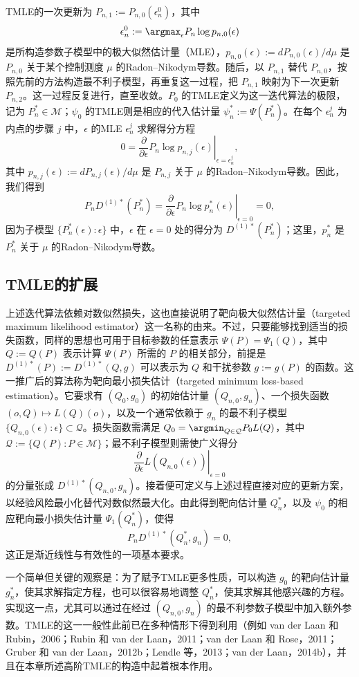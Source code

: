 TMLE的一次更新为 $P_{n,1}:=P_{n,0}(\epsilon_n^0)$，其中
\[
\epsilon_n^0:=\argmax_{\epsilon}P_n\log p_{n,0}(\epsilon)
\]
是所构造参数子模型中的极大似然估计量（MLE），$p_{n,0}(\epsilon):=dP_{n,0}(\epsilon)/d\mu$ 是 $P_{n,0}$ 关于某个控制测度 $\mu$ 的Radon--Nikodym导数。随后，以 $P_{n,1}$ 替代 $P_{n,0}$，按照先前的方法构造最不利子模型，再重复这一过程，把 $P_{n,1}$ 映射为下一次更新 $P_{n,2}$。这一过程反复进行，直至收敛。$P_0$ 的TMLE定义为这一迭代算法的极限，记为 $P_n^*\in\mathcal M$；$\psi_0$ 的TMLE则是相应的代入估计量 $\psi_n^*:=\Psi(P_n^*)$。在每个 $\epsilon_n^j$ 为内点的步骤 $j$ 中，$\epsilon$ 的MLE $\epsilon_n^j$ 求解得分方程
\[
0=\left.\frac{\partial}{\partial\epsilon}P_n\log p_{n,j}(\epsilon)\right|_{\epsilon=\epsilon_n^j},
\]
其中 $p_{n,j}(\epsilon):=dP_{n,j}(\epsilon)/d\mu$ 是 $P_{n,j}$ 关于 $\mu$ 的Radon--Nikodym导数。因此，我们得到
\[
P_nD^{(1)*}(P_n^*)=
\left.\frac{\partial}{\partial\epsilon}P_n\log p_n^*(\epsilon)\right|_{\epsilon=0}=0,
\]
因为子模型 $\{P_n^*(\epsilon):\epsilon\}$ 中，$\epsilon$ 在 $\epsilon=0$ 处的得分为 $D^{(1)*}(P_n^*)$；这里，$p_n^*$ 是 $P_n^*$ 关于 $\mu$ 的Radon--Nikodym导数。

\subsection{TMLE的扩展}

上述迭代算法依赖对数似然损失，这也直接说明了靶向极大似然估计量（targeted maximum likelihood estimator）这一名称的由来。不过，只要能够找到适当的损失函数，同样的思想也可用于目标参数的任意表示 $\Psi(P)=\Psi_1(Q)$，其中 $Q:=Q(P)$ 表示计算 $\Psi(P)$ 所需的 $P$ 的相关部分，前提是 $D^{(1)*}(P):=D^{(1)*}(Q,g)$ 可以表示为 $Q$ 和干扰参数 $g:=g(P)$ 的函数。这一推广后的算法称为靶向最小损失估计（targeted minimum loss-based estimation）。它要求有 $(Q_0,g_0)$ 的初始估计量 $(Q_{n,0},g_n)$、一个损失函数 $(o,Q)\mapsto L(Q)(o)$，以及一个通常依赖于 $g_n$ 的最不利子模型 $\{Q_{n,0}(\epsilon):\epsilon\}\subset\mathcal Q$。损失函数需满足 $Q_0=\argmin_{Q\in\mathcal Q}P_0L(Q)$，其中 $\mathcal Q:=\{Q(P):P\in\mathcal M\}$；最不利子模型则需使广义得分
\[
\left.\frac{\partial}{\partial\epsilon}L(Q_{n,0}(\epsilon))\right|_{\epsilon=0}
\]
的分量张成 $D^{(1)*}(Q_{n,0},g_n)$。接着便可定义与上述过程直接对应的更新方案，以经验风险最小化替代对数似然最大化。由此得到靶向估计量 $Q_n^*$，以及 $\psi_0$ 的相应靶向最小损失估计量 $\Psi_1(Q_n^*)$，使得
\[
P_nD^{(1)*}(Q_n^*,g_n)=0,
\]
这正是渐近线性与有效性的一项基本要求。

一个简单但关键的观察是：为了赋予TMLE更多性质，可以构造 $g_0$ 的靶向估计量 $g_n^*$，使其求解指定方程，也可以很容易地调整 $Q_n^*$，使其求解其他感兴趣的方程。实现这一点，尤其可以通过在经过 $(Q_{n,0},g_n)$ 的最不利参数子模型中加入额外参数。TMLE的这一一般性此前已在多种情形下得到利用（例如 van der Laan 和 Rubin，2006；Rubin 和 van der Laan，2011；van der Laan 和 Rose，2011；Gruber 和 van der Laan，2012b；Lendle 等，2013；van der Laan，2014b），并且在本章所述高阶TMLE的构造中起着根本作用。

